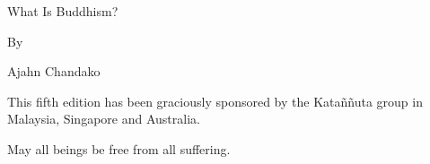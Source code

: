 

  \frontmatter
  \frontstyles

  \begin{frontenv}
    {\HUGE What Is Buddhism? \par}
    \vspace{3em}
    {\LARGE By \par}
    \vspace{0.5em}
    {\LARGE Ajahn Chandako}
  \end{frontenv}

  \newpage
  \begin{copyrightenv}
    
  \end{copyrightenv}

  \cleardoublepage
  \begin{dedicationenv}
    This fifth edition has been graciously sponsored by the Kataññuta group in
    Malaysia, Singapore and Australia.

    May all beings be free from all suffering.
  \end{dedicationenv}

  \cleardoublepage
  \mainmatter
  \mainstyles

  \begin{mainenv}
    
  \end{mainenv}

  \cleardoublepage
  \backmatter
  \backstyles

  \null
  \pagebreak
  \begin{licenseenv}
    
  \end{licenseenv}

  \null
  \pagebreak


